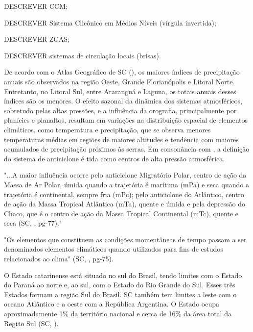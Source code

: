 DESCREVER \acrlong{CCM};

DESCREVER Sistema Clicônico em Médios Níveis (vírgula invertida);

DESCREVER \acrlong{ZCAS};

DESCREVER  sistemas de circulação locais (brisas).

\indent De acordo com o Atlas Geográfico de \acrlong{SC} (\citeyear{AtlasSCnatureza}), os maiores índices de precipitação anuais são observados na região Oeste, Grande Florianópolis e Litoral Norte. Entretanto, no Litoral Sul, entre Araranguá e Laguna, os totais anuais desses índices são os menores. O efeito sazonal da dinâmica dos sistemas atmosféricos, sobretudo pelas altas pressões, e a influência da orografia, principalmente por planícies e planaltos, resultam em variações na distribuição espacial de elementos climáticos, como temperatura e precipitação, que se observa menores temperaturas médias em regiões de maiores altitudes e tendência com maiores acumulados de precipitação próximos às serras. Em consonância com , a definição do sistema de anticiclone é tida como centros de alta pressão atmosférica.

\begin{citacao}
"...A maior influência ocorre pelo anticiclone Migratório Polar, centro de ação da Massa de Ar Polar, úmida quando a trajetória é marítima (mPa) e seca quando a trajetória é continental, sempre fria (mPc); pelo anticiclone do Atlântico, centro de ação da Massa Tropical Atlântica (mTa), quente e úmida e pela depressão do Chaco, que é o centro de ação da Massa Tropical Continental (mTc), quente e seca (\acrlong{SC}, \citeyear{AtlasSCnatureza}, pg-77)." 
\end{citacao}

\indent "Os elementos que constituem as condições momentâneas de tempo passam a ser denominados elementos climáticos quando utilizados para fins de estudos relacionados ao clima" (\acrlong{SC}, \citeyear{AtlasSCnatureza}, pg-75).



O Estado catarinense está situado no sul do Brasil, tendo limites com o Estado do Paraná ao norte e, ao sul, com o Estado do Rio Grande do Sul. Esses três Estados  formam a região Sul do Brasil. \acrlong{SC} também tem limites a leste com o oceano Atlântico e a oeste com a República Argentina.  O Estado ocupa aproximadamente 1\% da território nacional e  cerca de 16\% da área total da Região Sul (\acrlong{SC}, \citeyear{AtlasSCterritorio}).

